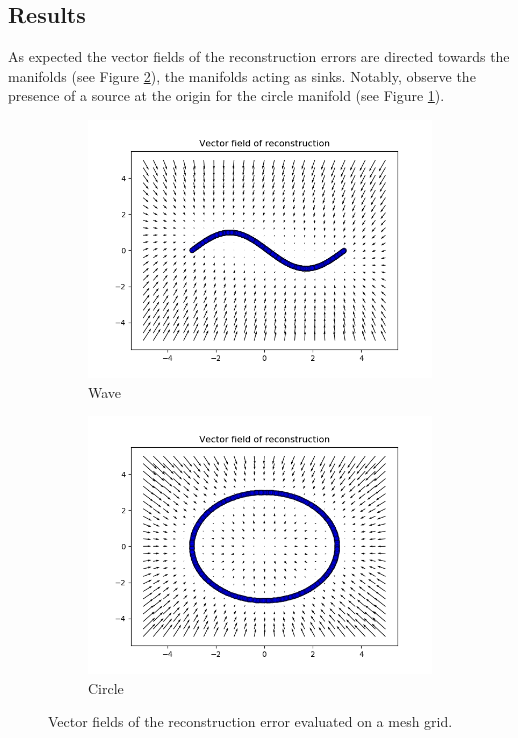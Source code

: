 \subsection*{Results}
As expected the vector fields of the reconstruction errors are directed towards the manifolds (see Figure \ref{fig:exp1-vector-fields}), the manifolds acting as sinks. Notably, observe the presence of a source at the origin for the circle manifold (see Figure \ref{fig:exp1-vf-circle}).
\begin{figure}[!h]
\centering
\begin{subfigure}{.5\textwidth}
  \centering
  \includegraphics[width=.95\linewidth]{figures/wave-vector-field}
  \caption{Wave}
\end{subfigure}%
\begin{subfigure}{.5\textwidth}
  \centering
  \includegraphics[width=.95\linewidth]{figures/circle-vector-field}
  \caption{Circle}
  \label{fig:exp1-vf-circle}
\end{subfigure}
\caption[Vector fields on wave and circle manifold]{Vector fields of the reconstruction error evaluated on a mesh grid.}
\label{fig:exp1-vector-fields}
\end{figure}

